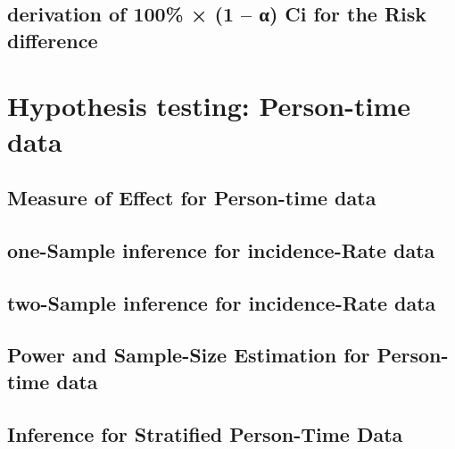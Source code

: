 \documentclass[12pt,]{article}
\begin{document}
\hypertarget{derivation-of-100-1--ci-for-the-risk-difference}{%
\subsection{derivation of 100\% × (1 -- α) Ci for the Risk
difference}\label{derivation-of-100-1--ci-for-the-risk-difference}}

\hypertarget{hypothesis-testing-person-time-data}{%
\section{Hypothesis testing: Person-time
data}\label{hypothesis-testing-person-time-data}}

\hypertarget{measure-of-effect-for-person-time-data}{%
\subsection{Measure of Effect for Person-time
data}\label{measure-of-effect-for-person-time-data}}

\hypertarget{one-sample-inference-for-incidence-rate-data}{%
\subsection{one-Sample inference for incidence-Rate
data}\label{one-sample-inference-for-incidence-rate-data}}

\hypertarget{two-sample-inference-for-incidence-rate-data}{%
\subsection{two-Sample inference for incidence-Rate
data}\label{two-sample-inference-for-incidence-rate-data}}

\hypertarget{power-and-sample-size-estimation-for-person-time-data}{%
\subsection{Power and Sample-Size Estimation for Person-time
data}\label{power-and-sample-size-estimation-for-person-time-data}}

\hypertarget{inference-for-stratified-person-time-data}{%
\subsection{Inference for Stratified Person-Time
Data}\label{inference-for-stratified-person-time-data}}
\end{document}
